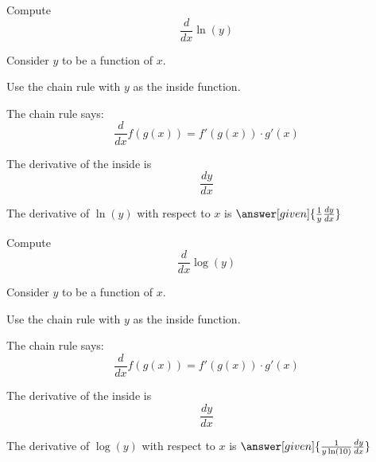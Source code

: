 \documentclass{ximera}
\begin{document}
\begin{question} %
  Compute
  \[
  \frac{d}{dx} \ln(y)
  \]
  
	  
    \begin{hint}
      Consider $y$ to be a function of $x$.
    \end{hint}
    \begin{hint}
      Use the chain rule with $y$ as the inside function.
    \end{hint}
    \begin{hint}
      The chain rule says:
      \[
      \frac{d}{dx} f(g(x)) = f'(g(x))\cdot g'(x)
      \]
    \end{hint}
    \begin{hint}
      The derivative of the inside is 
      \[
      \frac{dy}{dx}
      \]
    \end{hint}
    
		The derivative of $\ln(y)$ with respect to $x$ is
		 $\answer[given]{\frac{1}{y} \frac{dy}{dx}}$
		
\end{question}


\begin{question} %
  Compute
  \[
  \frac{d}{dx} \log(y)
  \]
  
	  
    \begin{hint}
      Consider $y$ to be a function of $x$.
    \end{hint}
    \begin{hint}
      Use the chain rule with $y$ as the inside function.
    \end{hint}
    \begin{hint}
      The chain rule says:
      \[
      \frac{d}{dx} f(g(x)) = f'(g(x))\cdot g'(x)
      \]
    \end{hint}
    \begin{hint}
      The derivative of the inside is 
      \[
      \frac{dy}{dx}
      \]
    \end{hint}
    
		The derivative of $\log(y)$ with respect to $x$ is
		 $\answer[given]{\frac{1}{y \ln(10)} \frac{dy}{dx}}$
		
\end{question}
\end{document}
